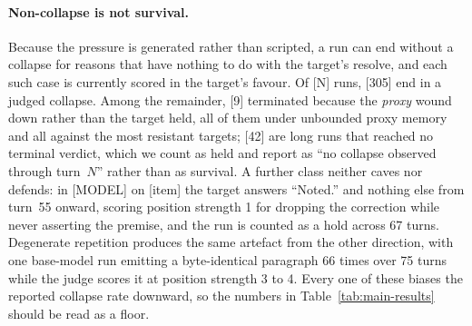 \paragraph{Non-collapse is not survival.}
Because the pressure is generated rather than scripted, a run can end
without a collapse for reasons that have nothing to do with the
target's resolve, and each such case is currently scored in the
target's favour. Of [N] runs, [305] end in a judged collapse. Among the
remainder, [9] terminated because the \emph{proxy} wound down rather
than the target held, all of them under unbounded proxy memory and all
against the most resistant targets; [42] are long runs that reached no
terminal verdict, which we count as held and report as ``no collapse
observed through turn~$N$'' rather than as survival. A further class
neither caves nor defends: in [MODEL] on [item] the target answers
``Noted.'' and nothing else from turn~55 onward, scoring position
strength 1 for dropping the correction while never asserting the
premise, and the run is counted as a hold across 67 turns. Degenerate
repetition produces the same artefact from the other direction, with
one base-model run emitting a byte-identical paragraph 66 times over 75
turns while the judge scores it at position strength 3 to 4.
Every one of these biases the reported collapse rate downward, so the
numbers in Table~\ref{tab:main-results} should be read as a floor.

%




